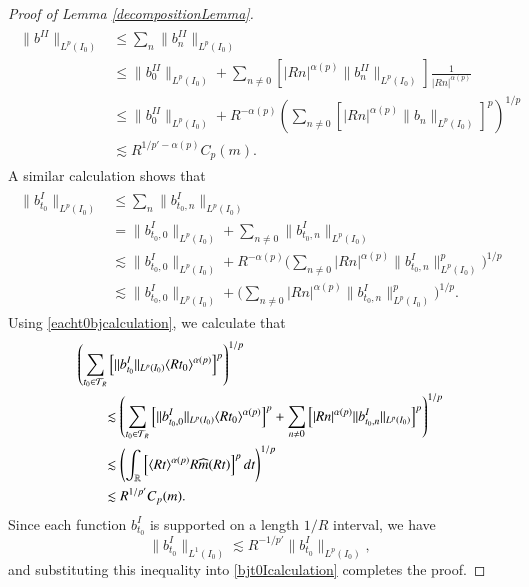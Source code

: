 \begin{proof} [Proof of Lemma \ref{decompositionLemma}]
    \begin{align}
    \begin{split}
        \|  b^{II} \|_{L^p(I_0)} &\leq \sum\nolimits_n \| b_{n}^{II} \|_{L^p(I_0)}\\
        &\leq \| b_{0}^{II} \|_{L^p(I_0)} + \sum\nolimits_{n \neq 0} \left[ |R n|^{\alpha(p)} \| b_{n}^{II} \|_{L^p(I_0)} \right] \frac{1}{|R n|^{\alpha(p)}}\\
        &\leq \| b_{0}^{II} \|_{L^p(I_0)} + R^{-\alpha(p)} \left( \sum\nolimits_{n \neq 0} \left[ |R n|^{\alpha(p)} \| b_{n} \|_{L^p(I_0)} \right]^p \right)^{1/p}\\ %
        &\lesssim R^{1/p' - \alpha(p)} C_p(m).
    \end{split}
    \end{align}
    A similar calculation shows that
    \begin{align} \label{eacht0bjcalculation}
    \begin{split}
        \| b_{t_0}^I \|_{L^p(I_0)} &\leq \sum\nolimits_n \| b_{t_0,n}^I \|_{L^p(I_0)}\\
        &= \| b_{t_0,0}^I \|_{L^p(I_0)} + \sum\nolimits_{n \neq 0} \| b_{t_0,n}^I \|_{L^p(I_0)}\\
        &\lesssim \| b_{t_0,0}^I \|_{L^p(I_0)} + R^{-\alpha(p)} \Big( \sum\nolimits_{n \neq 0} |R n|^{\alpha(p)} \| b_{t_0,n}^I \|_{L^p(I_0)}^p \Big)^{1/p}\\
        &\lesssim \| b_{t_0,0}^I \|_{L^p(I_0)} + \Big( \sum\nolimits_{n \neq 0} |R n|^{\alpha(p)} \| b_{t_0,n}^I \|_{L^p(I_0)}^p \Big)^{1/p}.
    \end{split}
    \end{align}
    Using \eqref{eacht0bjcalculation}, we calculate that
    \begin{align} \label{bjt0Icalculation}
    \begin{split}
        &\left( \sum_{t_0 \in \mathcal{T}_R} \left[ \| b_{t_0}^I \|_{L^p(I_0)} \langle R t_0 \rangle^{\alpha(p)} \right]^p \right)^{1/p}\\
        &\quad\quad \lesssim \left( \sum_{t_0 \in \mathcal{T}_R} \left[ \| b_{t_0,0}^I \|_{L^p(I_0)} \langle R t_0 \rangle^{\alpha(p)} \right]^p + \sum_{n \neq 0} \left[ |R n|^{\alpha(p)} \| b_{t_0,n}^I \|_{L^p(I_0)} \right]^p \right)^{1/p}\\
        &\quad\quad \lesssim \left( \int_{\operatorname{\mathbb{R}}} \left[ \langle R t \rangle^{\alpha(p)} R \widehat{m}(R t) \right]^p dt \right)^{1/p}\\
        &\quad\quad \lesssim R^{1/p'} C_p(m).
    \end{split}
    \end{align}
    Since each function $b_{t_0}^I$ is supported on a length $1/R$ interval, we have
    \begin{equation}
        \| b_{t_0}^I \|_{L^1(I_0)} \lesssim R^{-1/p'} \| b_{t_0}^I \|_{L^p(I_0)},
    \end{equation}
    and substituting this inequality into \eqref{bjt0Icalculation} completes the proof.
\end{proof}

